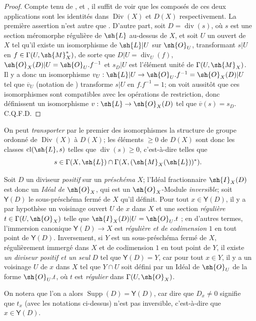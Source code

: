 \begin{proof}
Compte tenu de ,  et , il suffit de voir que les composés de ces deux applications sont les identités dans $\operatorname{Div}(X)$ et $D(X)$ respectivement.
La première assertion n'est autre que .
D'autre part, soit $D=\operatorname{div}(s)$, où $s$ est une section méromorphe régulière de $\sh{L}$ au-dessus de $X$, et soit $U$ un ouvert de $X$ tel qu'il existe un isomorphisme de $\sh{L}|U$ sur $\sh{O}_U$, transformant $s|U$ en $f\in\Gamma(U,\sh{M}_X^*)$, de sorte que $D|U=\operatorname{div}_U(f)$, $\sh{O}_X(D)|U=\sh{O}_U.f^{-1}$ et $s_D|U$ est l'élément unité de $\Gamma(U,\sh{M}_X)$.
Il y a donc un isomorphisme $v_U:\sh{L}|U\to\sh{O}_U.f^{-1}=\sh{O}_X(D)|U$ tel que $\overline{v}_U$ (notation de ) transforme $s|U$ en $f.f^{-1}=1$;
on voit aussitôt que ces isomorphismes sont compatibles avec les opérations de restriction, donc définissent un isomorphisme $v:\sh{L}\to\sh{O}_X(D)$ tel que $\overline{v}(s)=s_D$. C.Q.F.D.
\end{proof}

On peut \emph{transporter} par le premier des isomorphismes  la structure de groupe ordonné de $\operatorname{Div}(X)$ à $D(X)$;
les éléments $\geq0$ de $D(X)$ sont donc les classes $\operatorname{cl}(\sh{L},s)$ telles que $\operatorname{div}(s)\geq0$, c'est-à-dire  telles que
\[
  s\in\Gamma(X,\sh{L})\cap\Gamma(X,(\sh{M}_X(\sh{L}))^*).
\]

\begin{env}[21.2.12]
\label{IV.21.2.12}
Soit $D$ un diviseur \emph{positif} sur un \emph{préschéma} $X$;
l'Idéal fractionnaire $\sh{I}_X(D)$ est donc un \emph{Idéal de} $\sh{O}_X$, qui est un $\sh{O}_X$-Module \emph{inversible};
soit $\boldsymbol{\mathsf{Y}}(D)$ le sous-préschéma fermé de $X$ qu'il définit.
Pour tout $x\in\boldsymbol{\mathsf{Y}}(D)$, il y a par hypothèse un voisinage ouvert $U$ de $x$ dans $X$ et une section \emph{régulière} $t\in\Gamma(U,\sh{O}_X)$ telle que $\sh{I}_X(D)|U=\sh{O}_U.t$ ;
en d'autres termes, l'immersion canonique $\boldsymbol{\mathsf{Y}}(D)\to X$ est \emph{régulière et de codimension $1$}  en tout point de $\boldsymbol{\mathsf{Y}}(D)$.
Inversement, si $Y$ est un sous-préschéma fermé de $X$, régulièrement immergé dans $X$ et de codimension $1$ en tout point de $Y$, il existe \emph{un diviseur positif et un seul} $D$ tel que $\boldsymbol{\mathsf{Y}}(D)=Y$, car pour tout $x\in Y$, il y a un voisinage $U$ de $x$ dans $X$ tel que $Y\cap U$ soit défini par un Idéal de $\sh{O}_U$ de la forme $\sh{O}_U.t$, où $t$ est \emph{régulier} dans $\Gamma(U,\sh{O}_X)$.

On notera que l'on a alors $\operatorname{Supp}(D)=\boldsymbol{\mathsf{Y}}(D)$, car dire que $D_x\neq0$ signifie que $t_x$ (avec les notations ci-dessus) n'est pas inversible, c'est-à-dire que $x\in\boldsymbol{\mathsf{Y}}(D)$.
\end{env}

